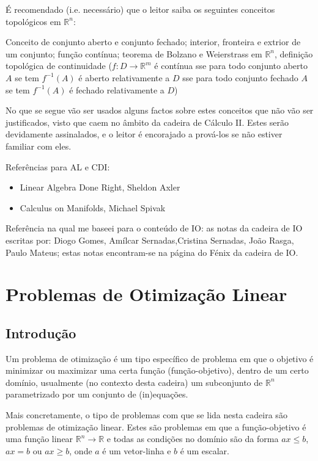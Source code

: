 \documentclass{article}
\newcommand{\R}{\mathbb{R}}
\theoremstyle{definition}
\begin{document}
	É recomendado (i.e. necessário) que o leitor saiba os seguintes conceitos topológicos em $\R^n$:
	
	Conceito de conjunto aberto e conjunto fechado; interior, fronteira e extrior de um conjunto; função contínua; teorema de Bolzano e Weierstrass em $\R^n$, definição topológica de continuidade ($f : D \rightarrow \R^m$ é contínua sse para todo conjunto aberto $A$ se tem $f^{-1}(A)$ é aberto relativamente a $D$ sse para todo conjunto fechado $A$ se tem $f^{-1}(A)$ é fechado relativamente a $D$)
	
	No que se segue vão ser usados alguns factos sobre estes conceitos que não vão ser justificados, visto que caem no âmbito da cadeira de Cálculo II. Estes serão devidamente assinalados, e o leitor é encorajado a prová-los se não estiver familiar com eles.
	
	Referências para AL e CDI:
	\begin{itemize}
	\item Linear Algebra Done Right, Sheldon Axler
	\item Calculus on Manifolds, Michael Spivak
	\end{itemize}
	
	Referência na qual me baseei para o conteúdo de IO: as notas da cadeira de IO escritas por: Diogo Gomes, Amílcar Sernadas,Cristina Sernadas, João Rasga, Paulo Mateus; estas notas encontram-se na página do Fénix da cadeira de IO.
	
	\section{Problemas de Otimização Linear}
	
	\subsection{Introdução}
	
	Um problema de otimização é um tipo específico de problema em que o objetivo é minimizar ou maximizar uma certa função (função-objetivo), dentro de um certo domínio, usualmente (no contexto desta cadeira) um subconjunto de $\R^n$ parametrizado por um conjunto de (in)equações.
	
	Mais concretamente, o tipo de problemas com que se lida nesta cadeira são problemas de otimização linear. Estes são problemas em que a função-objetivo é uma função linear $\R^n \rightarrow \R$ e todas as condições no domínio são da forma $ax \leq b$, $ax = b$ ou $ax \geq b$, onde $a$ é um vetor-linha e $b$ é um escalar.
	
\end{document}
